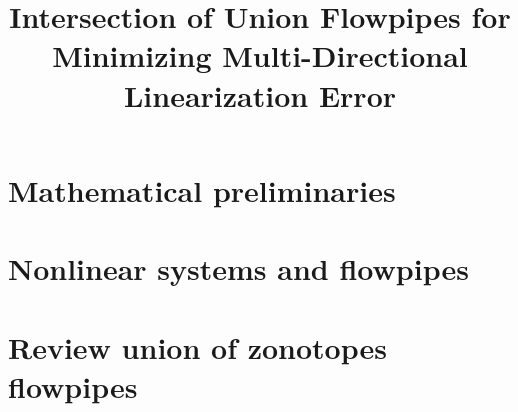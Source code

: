 


\title{Intersection of Union Flowpipes for Minimizing Multi-Directional Linearization Error}
\author{}
\institute{}
%
    
\maketitle

\section{Mathematical preliminaries}


\section{Nonlinear systems and flowpipes}


\section{Review union of zonotopes flowpipes}






